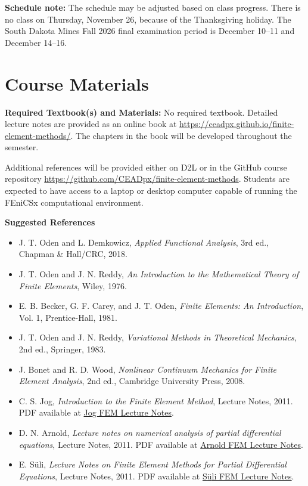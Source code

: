 \documentclass[12pt]{article}
\newcommand{\syllabussubheading}[1]{%
  \par\addvspace{0.35em}%
  \noindent\textbf{#1}\par\nobreak\vspace{0.02em}%
}
\newcommand{\coursefield}[2]{%
  \vspace{0.2em}\noindent\textbf{#1} #2\par
}
\begin{document}
\coursefield{Schedule note:}{The schedule may be adjusted based on class progress. There is no class on Thursday, November 26, because of the Thanksgiving holiday. The South Dakota Mines Fall 2026 final examination period is December 10--11 and December 14--16.}

\section{Course Materials}
\coursefield{Required Textbook(s) and Materials:}{No required textbook. Detailed lecture notes are provided as an online book at \href{https://ceadpx.github.io/finite-element-methods/}{https://ceadpx.github.io/finite-element-methods/}. The chapters in the book will be developed throughout the semester.

Additional references will be provided either on D2L or in the GitHub course repository \href{https://github.com/CEADpx/finite-element-methods}{https://github.com/CEADpx/finite-element-methods}. Students are expected to have access to a laptop or desktop computer capable of running the FEniCSx computational environment.}


\syllabussubheading{Suggested References}
\begin{itemize}
  \item J. T. Oden and L. Demkowicz, \textit{Applied Functional Analysis}, 3rd ed., Chapman \& Hall/CRC, 2018.
  \item J. T. Oden and J. N. Reddy, \textit{An Introduction to the Mathematical Theory of Finite Elements}, Wiley, 1976.
  \item E. B. Becker, G. F. Carey, and J. T. Oden, \textit{Finite Elements: An Introduction}, Vol. 1, Prentice-Hall, 1981.
  \item J. T. Oden and J. N. Reddy, \textit{Variational Methods in Theoretical Mechanics}, 2nd ed., Springer, 1983.
  \item J. Bonet and R. D. Wood, \textit{Nonlinear Continuum Mechanics for Finite Element Analysis}, 2nd ed., Cambridge University Press, 2008.
  \item C. S. Jog, \textit{Introduction to the Finite Element Method}, Lecture Notes, 2011. PDF available at \href{https://mecheng.iisc.ac.in/csjog/me257Notes/fem.pdf}{Jog FEM Lecture Notes}.
  \item D. N. Arnold, \textit{Lecture notes on numerical analysis of partial differential equations}, Lecture Notes, 2011. PDF available at \href{https://www-users.cse.umn.edu/~arnold/8445.f12/notes.pdf}{Arnold FEM Lecture Notes}.
  \item E. S{\"u}li, \textit{Lecture Notes on Finite Element Methods for Partial Differential Equations}, Lecture Notes, 2011. PDF available at \href{https://people.maths.ox.ac.uk/suli/fem.pdf}{S{\"u}li FEM Lecture Notes}.
\end{itemize}
\end{document}
